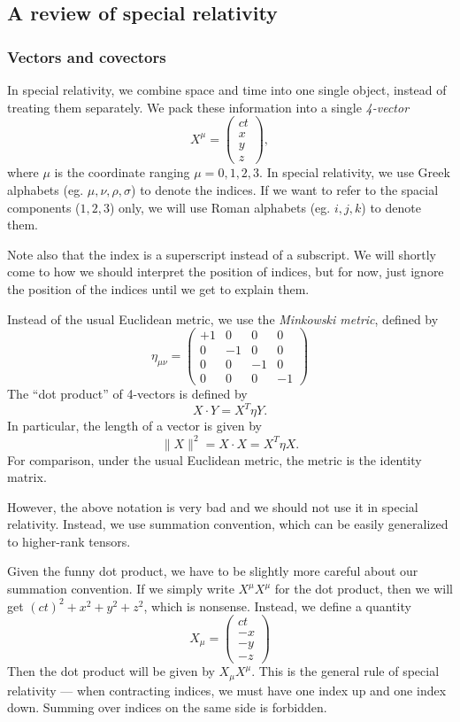 \documentclass[a4paper]{article}
\begin{document}
\subsection{A review of special relativity}
\subsubsection{Vectors and covectors}
In special relativity, we combine space and time into one single object, instead of treating them separately. We pack these information into a single \emph{4-vector}
\[
  X^\mu =
  \begin{pmatrix}
    ct\\
    x\\
    y\\
    z
  \end{pmatrix},
\]
where $\mu$ is the coordinate ranging $\mu = 0, 1, 2, 3$. In special relativity, we use Greek alphabets (eg. $\mu, \nu, \rho, \sigma$) to denote the indices. If we want to refer to the spacial components ($1, 2, 3$) only, we will use Roman alphabets (eg. $i, j, k$) to denote them.

Note also that the index is a superscript instead of a subscript. We will shortly come to how we should interpret the position of indices, but for now, just ignore the position of the indices until we get to explain them.

Instead of the usual Euclidean metric, we use the \emph{Minkowski metric}, defined by
\[
  \eta_{\mu\nu} =
  \begin{pmatrix}
    +1 & 0 & 0 & 0\\
    0 & -1 & 0 & 0\\
    0 & 0 & -1 & 0\\
    0 & 0 & 0 & -1
  \end{pmatrix}
\]
The ``dot product'' of 4-vectors is defined by
\[
  X\cdot Y = X^T\eta Y.
\]
In particular, the length of a vector is given by
\[
  \|X\|^2 = X\cdot X = X^T\eta X.
\]
For comparison, under the usual Euclidean metric, the metric is the identity matrix.

However, the above notation is very bad and we should not use it in special relativity. Instead, we use summation convention, which can be easily generalized to higher-rank tensors.

Given the funny dot product, we have to be slightly more careful about our summation convention. If we simply write $X^\mu X^\mu$ for the dot product, then we will get $(ct)^2 + x^2 + y^2 + z^2$, which is nonsense. Instead, we define a quantity
\[
  X_\mu = \begin{pmatrix}
    ct\\
    -x\\
    -y\\
    -z
  \end{pmatrix}
\]
Then the dot product will be given by $X_\mu X^\mu$. This is the general rule of special relativity --- when contracting indices, we must have one index up and one index down. Summing over indices on the same side is forbidden.
\end{document}
